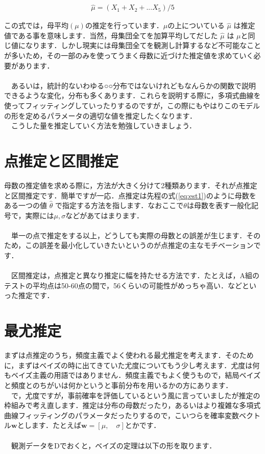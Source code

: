 \documentclass[11pt,a4paper]{ujreport} 	%
\begin{document}
\begin{align}
\label{eq:est1}
\hat \mu = (X_1 + X_2 + ... X_5)/5
\end{align}

この式では，母平均$(\mu)$の推定を行っています．$\mu$の上についている $\hat \mu$ は推定値である事を意味します．当然，母集団全てを加算平均してだした $\hat \mu$ は $\mu$と同じ値になります．しかし現実には母集団全てを観測し計算するなど不可能なことが多いため，その一部のみを使ってうまく母数に近づけた推定値を求めていく必要があります．\\
\\
　あるいは，統計的ないわゆる○○分布ではないけれどもなんらかの関数で説明できるような変化，分布も多くあります．これらを説明する際に，多項式曲線を使ってフィッティングしていったりするのですが，この際にもやはりこのモデルの形を定めるパラメータの適切な値を推定したくなります．\\
　こうした量を推定していく方法を勉強していきましょう．\\

\section{点推定と区間推定}
母数の推定値を求める際に，方法が大きく分けて2種類あります．それが点推定と区間推定です．簡単ですが一応．点推定は先程の式(\ref{eq:est1})のように母数をある一つの値 $\hat \theta$ で指定する方法を指します．なおここで$\theta$は母数を表す一般化記号で，実際には$\mu, \sigma$などがあてはまります．\\
\\
　単一の点で推定をする以上，どうしても実際の母数との誤差が生じます．そのため，この誤差を最小化していきたいというのが点推定の主なモチベーションです．\\
\\
　区間推定は，点推定と異なり推定に幅を持たせる方法です．たとえば，A組のテストの平均点は50-60点の間で，56くらいの可能性がめっちゃ高い．などといった推定です．

\section{最尤推定}
まずは点推定のうち，頻度主義でよく使われる最尤推定を考えます．そのために，まずはベイズの時に出てきていた尤度についてもう少し考えます．尤度は何もベイズ主義の用語ではありません．頻度主義でもよく使うもので，結局ベイズと頻度とのちがいは何かというと事前分布を用いるかの方にあります．\\
　で，尤度ですが，事前確率を評価しているという風に言っていましたが推定の枠組みで考え直します．推定は分布の母数だったり，あるいはより複雑な多項式曲線フィッティングのパラメータだったりするので，こいつらを確率変数ベクトル$\mathbf{w}$とします．たとえば$\mathbf{w} = [\mu, \quad \sigma]$とかです．\\
\\
　観測データをDでおくと，ベイズの定理は以下の形を取ります．
\end{document}
